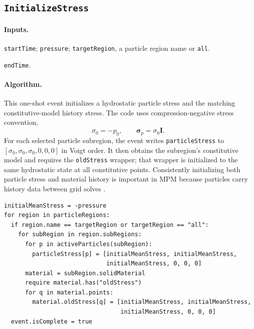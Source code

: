 \subsection{\texttt{InitializeStress}}
\label{subsec:event-initialize-stress}

\paragraph{Inputs.}
\begin{description}[leftmargin=*,style=nextline]
\item[\textbf{Required.}] \texttt{startTime}; \texttt{pressure}; \texttt{targetRegion}, a particle region name or \texttt{all}.
\item[\textbf{Optional.}] \texttt{endTime}.
\end{description}

\paragraph{Algorithm.}
This one-shot event initializes a hydrostatic particle stress and the matching constitutive-model history stress.  The code uses compression-negative stress convention,
\begin{equation}
  \sigma_0=-p_0,
  \qquad
  \boldsymbol{\sigma}_p=\sigma_0\mathbf{I}.
  \label{eq:initialize-stress}
\end{equation}
For each selected particle subregion, the event writes \texttt{particleStress} to $[\sigma_0,\sigma_0,\sigma_0,0,0,0]$ in Voigt order.  It then obtains the subregion's constitutive model and requires the \texttt{oldStress} wrapper; that wrapper is initialized to the same hydrostatic state at all constitutive points.  Consistently initializing both particle stress and material history is important in MPM because particles carry history data between grid solves \cite{sulsky1994history,sulsky1995solid}.

\begin{lstlisting}[caption={InitializeStress event pseudocode.}]
initialMeanStress = -pressure
for region in particleRegions:
  if region.name == targetRegion or targetRegion == "all":
    for subRegion in region.subRegions:
      for p in activeParticles(subRegion):
        particleStress[p] = [initialMeanStress, initialMeanStress,
                             initialMeanStress, 0, 0, 0]
      material = subRegion.solidMaterial
      require material.has("oldStress")
      for q in material.points:
        material.oldStress[q] = [initialMeanStress, initialMeanStress,
                                 initialMeanStress, 0, 0, 0]
  event.isComplete = true
\end{lstlisting}

